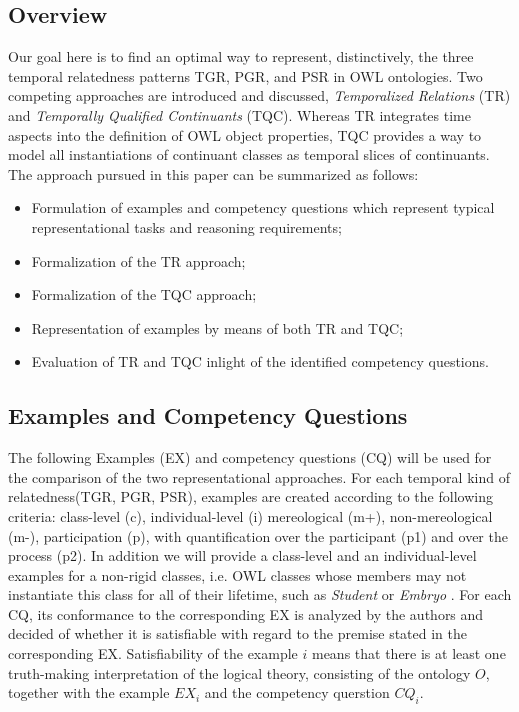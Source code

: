 \subsection*{Overview}
Our goal here is to find an optimal way to represent, distinctively, the three temporal relatedness patterns TGR, PGR, and PSR in OWL ontologies. 
Two competing approaches 
are introduced and discussed, \emph{Temporalized Relations} (TR) and \emph{Temporally Qualified Continuants} (TQC). Whereas TR integrates time 
aspects into the definition of OWL object properties, TQC provides a way to model all instantiations of continuant classes as temporal slices of continuants. 
The approach pursued in this paper can be summarized as follows:

\begin{itemize}
\item
Formulation of examples and competency questions which represent typical representational tasks and reasoning requirements; 
\item
Formalization of the TR approach;
\item 
Formalization of the TQC approach;
\item 
Representation of examples by means of both TR and TQC; 
\item 
Evaluation of TR and TQC inlight of the identified competency questions. 

\end{itemize}


\subsection*{Examples and Competency Questions}
 
The following Examples (EX) and competency questions (CQ) will be used for the comparison of the two representational approaches. 
For each temporal kind of relatedness(TGR, PGR, PSR), examples are created according to the following criteria:  
class-level (c), individual-level (i) mereological (m+), non-mereological (m-), participation (p), 
with quantification over the participant (p1) and over the process (p2). 
In addition we will provide a class-level and an individual-level examples for a non-rigid classes, i.e. OWL classes whose members may not instantiate this class for all of their lifetime, such as \emph{Student} or \emph{Embryo} \cite{OntoClean}. 
For each CQ, its conformance to the corresponding EX is analyzed by the authors and decided of whether it is satisfiable with regard to the premise stated in the corresponding EX. Satisfiability of the example $i$ means that there is at least one truth-making interpretation of the logical theory, consisting of the ontology $O$, together with the example $EX_i$ and the competency querstion $CQ_i$.  
 

